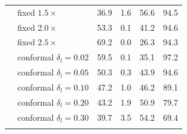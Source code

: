 \begin{table}[tb]
\begin{tabular}{llrrrr}
 & fixed $1.5\times$ & 36.9 & 1.6 & 56.6 & 94.5 \\
 & fixed $2.0\times$ & 53.3 & 0.1 & 41.2 & 94.6 \\
 & fixed $2.5\times$ & 69.2 & 0.0 & 26.3 & 94.3 \\
 & conformal $\delta_l=0.02$ & 59.5 & 0.1 & 35.1 & 97.2 \\
 & conformal $\delta_l=0.05$ & 50.3 & 0.3 & 43.9 & 94.6 \\
 & conformal $\delta_l=0.10$ & 47.2 & 1.0 & 46.2 & 89.1 \\
 & conformal $\delta_l=0.20$ & 43.2 & 1.9 & 50.9 & 79.7 \\
 & conformal $\delta_l=0.30$ & 39.7 & 3.5 & 54.2 & 69.4 \\
\addlinespace[2pt]
\bottomrule
\end{tabular}
\end{table}
